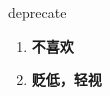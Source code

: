 
\begin{frame}
{\huge deprecate}
\begin{center}
\begin{enumerate}\Large
  \item \textbf{不喜欢}
  \item \textbf{贬低，轻视}
\end{enumerate}
\end{center}
\end{frame}
